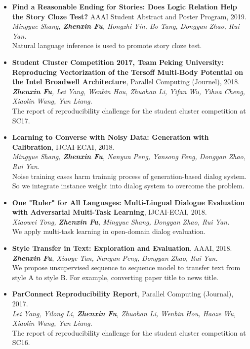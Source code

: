 \documentclass[letterpaper]{article}
\begin{document}
\begin{itemize}
\item \textbf{Find a Reasonable Ending for Stories: Does Logic Relation Help the Story Cloze Test?} AAAI Student Abstract and Poster Program, 2019. \\
{\it Mingyue Shang, \textbf{Zhenxin Fu}, Hongzhi Yin, Bo Tang, Dongyan Zhao, Rui Yan.} \\
Natural language inference is used to promote story cloze test.

\item \textbf{Student Cluster Competition 2017, Team Peking University: Reproducing Vectorization of the Tersoff Multi-Body Potential on the Intel Broadwell Architecture}, Parallel Computing (Journel), 2018. \\
{\it \textbf{Zhenxin Fu}, Lei Yang, Wenbin Hou, Zhuohan Li, Yifan Wu, Yihua Cheng, Xiaolin Wang, Yun Liang.} \\
  The report of reproducibility challenge for the student cluster competition at SC17.

\item \textbf{Learning to Converse with Noisy Data: Generation with Calibration}, IJCAI-ECAI, 2018. \\
  {\it Mingyue Shang, \textbf{Zhenxin Fu}, Nanyun Peng, Yansong Feng, Dongyan Zhao, Rui Yan.}  \\
  Noise training cases harm trainnig process of generation-based dialog system. So we integrate instance weight into dialog system to overcome the problem.

\item \textbf{One "Ruler" for All Languages: Multi-Lingual Dialogue Evaluation with Adversarial Multi-Task Learning}, IJCAI-ECAI, 2018. \\
  {\it Xiaowei Tong, \textbf{Zhenxin Fu}, Mingyue Shang, Dongyan Zhao, Rui Yan.} \\
  We apply multi-task learning in open-domain dialog evaluation.

\item \textbf{Style Transfer in Text: Exploration and Evaluation}, AAAI, 2018. \\
  {\it \textbf{Zhenxin Fu}, Xiaoye Tan, Nanyun Peng, Dongyan Zhao, Rui Yan.} \\
  We propose unsupervised sequence to sequence model to transfer text from style A to style B. For example, converting paper title to news title.
  
\item \textbf{ParConnect Reproducibility Report}, Parallel Computing (Journal), 2017.\\
  {\it Lei Yang, Yilong Li, \textbf{Zhenxin Fu}, Zhuohan Li, Wenbin Hou, Haoze Wu, Xiaolin Wang, Yun Liang.} \\
  The report of reproducibility challenge for the student cluster competition at SC16.
\end{itemize}
\end{document}
